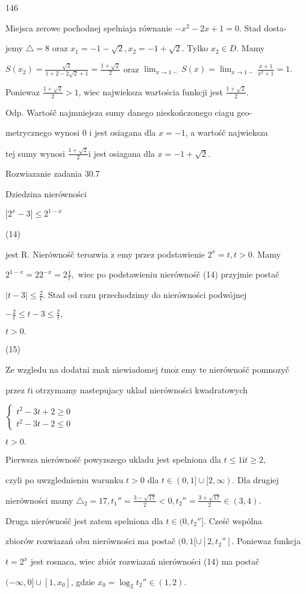\documentclass[a4paper,12pt]{article}
\begin{document}
146

Miejsca zerowe pochodnej spelniaja równanie $-x^{2}-2x+1=0$. Stad dosta-

jemy $\triangle= 8$ oraz $x_{1} = -1-\sqrt{2}, x_{2} = -1+\sqrt{2}$. Tylko $x_{2} \in D$. Mamy

$S(x_{2}) = \displaystyle \frac{\sqrt{2}}{1+2-2\sqrt{2}+1} = \displaystyle \frac{1+\sqrt{2}}{2}$ oraz $\displaystyle \lim_{x\rightarrow 1-}S(x) = \displaystyle \lim_{x\rightarrow 1-}\frac{x+1}{x^{2}+1} = 1.$

Poniewaz $\displaystyle \frac{1+\sqrt{2}}{2}>1$, wiec najwieksza wartościa funkcji jest $\displaystyle \frac{1+\sqrt{2}}{2}.$

Odp. Wartośč najmniejsza sumy danego nieskończonego ciagu geo-

metrycznego wynosi 0 $\mathrm{i}$ jest osiagana dla $x = -1$, a wartośč najwieksza

tej sumy wynosi $\displaystyle \frac{1+\sqrt{2}}{2}\mathrm{i}$ jest osiagana dla $x=-1+\sqrt{2}.$

Rozwiazanie zadania 30.7

Dziedzina nierówności

$|2^{x}-3|\leq 2^{1-x}$

(14)

jest R. Nierównośč $\mathrm{t}\mathrm{e}\mathrm{r}$ozwia $\dot{\mathrm{z}}$ emy przez podstawienie $2^{x}=t, t>0$. Mamy

$2^{1-x}=22^{-x}=2\displaystyle \frac{1}{t},$ wiec po podstawieniu nierównośč (14) przyjmie postač

$|t-3|\displaystyle \leq\frac{2}{t}$. Stad od razu przechodzimy do nierówności podwójnej

$-\displaystyle \frac{2}{t}\leq t-3\leq\frac{2}{t},$

$t>0.$

(15)

Ze wzgledu na dodatni znak niewiadomej $t \mathrm{m}\mathrm{o}\dot{\mathrm{z}}$ emy $\mathrm{t}\mathrm{e}$ nierównośč pomnozyč

przez $t\mathrm{i}$ otrzymamy nastepujacy uklad nierówności kwadratowych

$\left\{\begin{array}{l}
t^{2}-3t+2\geq 0\\
t^{2}-3t-2\leq 0
\end{array}\right.$

$t>0.$

Pierwsza nierównośč powyzszego ukladu jest spelniona dla $t \leq 1 \mathrm{i}t \geq 2,$

czyli po uwzglednieniu warunku $t> 0$ dla $ t\in (0,1]\cup[2,\infty)$. Dla drugiej

nierówności mamy $\triangle_{2} = 17, t_{1}'' = \displaystyle \frac{3-\sqrt{17}}{2} < 0, t_{2}'' = \displaystyle \frac{3+\sqrt{17}}{2} \in (3,4).$

Druga nierównośč jest zatem spelniona dla $t \in (0,t_{2}''$]. Cześč wspólna

zbiorów rozwiazań obu nierówności ma postač $(0,1[\cup[2,t_{2}'']$. Poniewaz funkcja

$t = 2^{x}$ jest rosnaca, wiec zbiór rozwiazań nierówności (14) ma postač

$(-\infty,0]\cup[1,x_{0}]$, gdzie $x_{0}=\log_{2}t_{2}''\in(1,2).$
\end{document}
